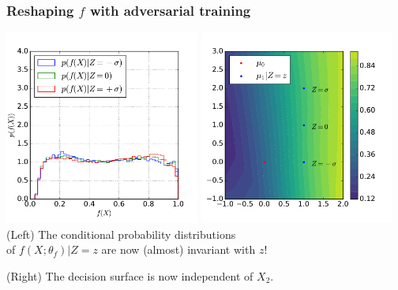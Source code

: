 \documentclass{beamer}
\begin{document}
\begin{frame}
    \frametitle{Reshaping $f$ with adversarial training}

    \begin{center}
        \includegraphics[width=0.48\textwidth]{figures/f-adversary.pdf}
        \includegraphics[width=0.48\textwidth]{figures/surface-adversary.pdf}\\
        (Left) The conditional probability distributions \\
        of $f(X;\theta_f)|Z=z$ are {\color{blue}now (almost) invariant with $z$}!

        \vspace{0.25cm}

        (Right) The decision surface is {\color{blue} now independent of $X_2$}.
    \end{center}
\end{frame}
\end{document}

